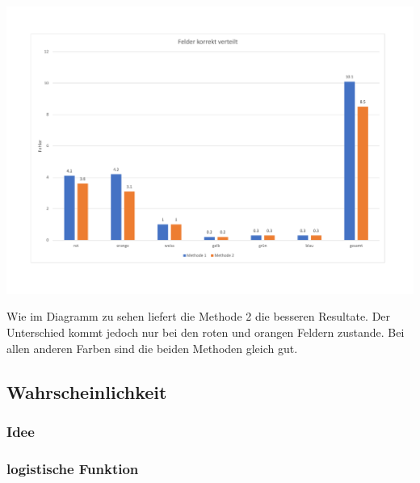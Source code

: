 \documentclass[a4paper, 12pt]{article}
\begin{document}
\includegraphics[scale=0.4]{Felder_korrekt_verteilt}

Wie im Diagramm zu sehen liefert die Methode 2 die besseren Resultate. Der Unterschied kommt jedoch nur bei den roten und orangen Feldern zustande. Bei allen anderen Farben sind die beiden Methoden gleich gut. 
\subsection{Wahrscheinlichkeit}
\subsubsection{Idee}
\subsubsection{logistische Funktion}
\end{document}
